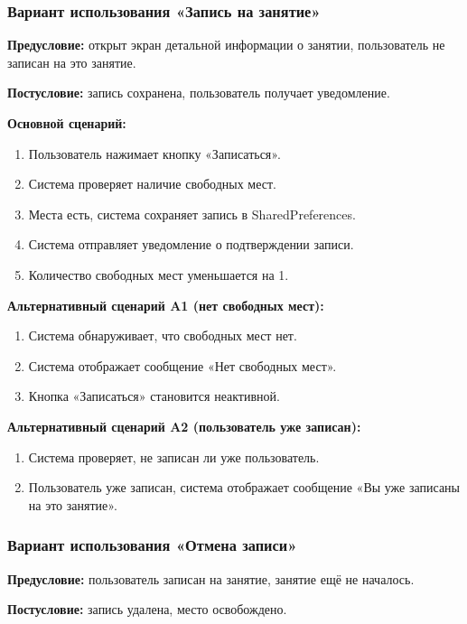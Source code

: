 \subsubsection{Вариант использования «Запись на занятие»}

\textbf{Предусловие:} открыт экран детальной информации о занятии, пользователь не записан на это занятие.

\textbf{Постусловие:} запись сохранена, пользователь получает уведомление.

\textbf{Основной сценарий:}
\begin{enumerate}
	\item Пользователь нажимает кнопку «Записаться».
	\item Система проверяет наличие свободных мест.
	\item Места есть, система сохраняет запись в SharedPreferences.
	\item Система отправляет уведомление о подтверждении записи.
	\item Количество свободных мест уменьшается на 1.
\end{enumerate}

\textbf{Альтернативный сценарий A1 (нет свободных мест):}
\begin{enumerate}
	\item Система обнаруживает, что свободных мест нет.
	\item Система отображает сообщение «Нет свободных мест».
	\item Кнопка «Записаться» становится неактивной.
\end{enumerate}

\textbf{Альтернативный сценарий A2 (пользователь уже записан):}
\begin{enumerate}
	\item Система проверяет, не записан ли уже пользователь.
	\item Пользователь уже записан, система отображает сообщение «Вы уже записаны на это занятие».
\end{enumerate}

\subsubsection{Вариант использования «Отмена записи»}

\textbf{Предусловие:} пользователь записан на занятие, занятие ещё не началось.

\textbf{Постусловие:} запись удалена, место освобождено.

